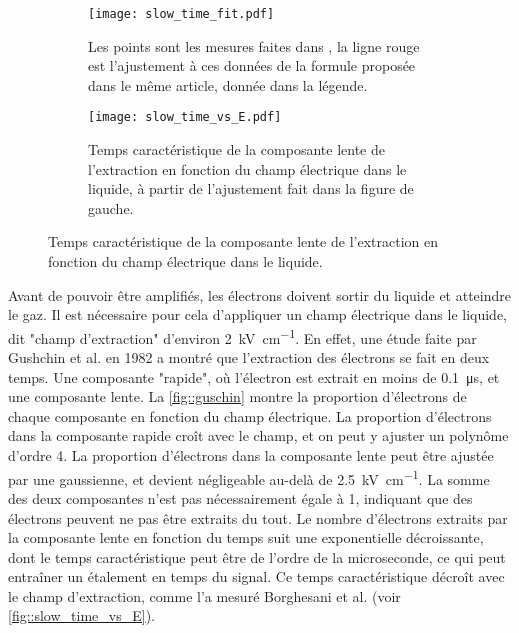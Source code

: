       \begin{figure}[!htb]
        \begin{subfigure}[t]{0.5\textwidth}
          \flushleft
          \captionsetup{width=.95\linewidth}
          \texttt{[image: slow\_time\_fit.pdf]}
          \caption{Les points sont les mesures faites dans \cite{Borghesani1990}, la ligne rouge est l'ajustement à ces données de la formule proposée dans le même article, donnée dans la légende.}
        \end{subfigure}
        \begin{subfigure}[t]{0.5\textwidth}
          \flushright        
          \captionsetup{width=.95\linewidth}
          \texttt{[image: slow\_time\_vs\_E.pdf]}
          \caption{Temps caractéristique de la composante lente de l'extraction en fonction du champ électrique dans le liquide, à partir de l'ajustement fait dans la figure de gauche.}
        \end{subfigure}
        \caption[Temps caractéristique l'extraction en fonction du champ électrique]{\label{fig::slow_time_vs_E}Temps caractéristique de la composante lente de l'extraction en fonction du champ électrique dans le liquide.}
      \end{figure}

      Avant de pouvoir être amplifiés, les électrons doivent sortir du liquide et atteindre le gaz. Il est nécessaire pour cela d'appliquer un champ électrique dans le liquide, dit "champ d'extraction" d'environ \SI{2}{\kilo\volt\per\centi\meter}. En effet, une étude faite par Gushchin et al. en 1982\cite{guschin} a montré que l'extraction des électrons se fait en deux temps. Une composante "rapide", où l'électron est extrait en moins de \SI{0.1}{\micro\second}, et une composante lente.  La \autoref{fig::guschin} montre la proportion d'électrons de chaque composante en fonction du champ électrique. La proportion d'électrons dans la composante rapide croît avec le champ, et on peut y ajuster un polynôme d'ordre 4. La proportion d'électrons dans la composante lente peut être ajustée par une gaussienne, et devient négligeable au-delà de \SI{2.5}{\kilo\volt\per\centi\meter}. La somme des deux composantes n'est pas nécessairement égale à 1, indiquant que des électrons peuvent ne pas être extraits du tout. Le nombre d'électrons extraits par la composante lente en fonction du temps suit une exponentielle décroissante, dont le temps caractéristique peut être de l'ordre de la microseconde\cite{Borghesani1990}, ce qui peut entraîner un étalement en temps du signal. Ce temps caractéristique décroît avec le champ d'extraction, comme l'a mesuré Borghesani et al.\cite{Borghesani1990} (voir \autoref{fig::slow_time_vs_E}). %

